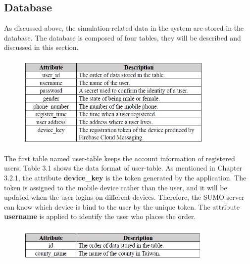 \documentclass[12pt]{ksthesis}
\begin{document}
\begin{thesis}
{\section{Database}
As discussed above, the simulation-related data in the system are stored in the database. The database is composed of four tables, they will be described and discussed in this section.

\begin{figure}[t]
\centering
{}
\includegraphics[width=0.85\textwidth]{./figures/Table3-1-UserTable.PNG}

\vspace{0.5cm}
\label{Fig:UserTable}
\end{figure}

 
The first table named user-table keeps the account information of registered users. Table 3.1 shows the data format of user-table. As mentioned in Chapter 3.2.1, the attribute \textbf{device\_key} is the token generated by the application. The token is assigned to the mobile device rather than the user, and it will be updated when the user logins on different devices. Therefore, the SUMO server can know which device is bind to the user by the unique token. The attribute \textbf{username} is applied to identify the user who places the order.





\begin{figure}[H]
\centering
{}
\includegraphics[width=0.85\textwidth]{./figures/Table3-2-CountyTable.PNG}
\vspace{0.5cm}
\label{Fig:CountyTable}
\end{figure}

}
\end{thesis}
\end{document}
